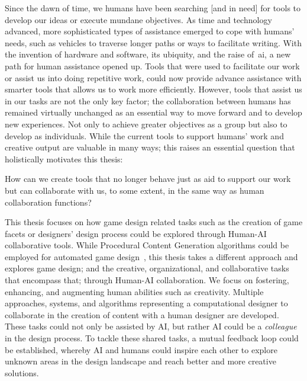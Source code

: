 Since the dawn of time, we humans have been searching [and in need] for tools to develop our ideas or execute mundane objectives. As time and technology advanced, more sophisticated types of assistance emerged to cope with humans' needs, such as vehicles to traverse longer paths or ways to facilitate writing. With the invention of hardware and software, its ubiquity, and the raise of~\acrfull{ai}, a new path for human assistance opened up. Tools that were used to facilitate our work or assist us into doing repetitive work, could now provide advance assistance with smarter tools that allows us to work more efficiently. However, tools that assist us in our tasks are not the only key factor; the collaboration between humans has remained virtually unchanged as an essential way to move forward and to develop new experiences. Not only to achieve greater objectives as a group but also to develop as individuals. While the current tools to support humans' work and creative output are valuable in many ways; this raises an essential question that holistically motivates this thesis:

\setlength{\parindent}{0.9em}

\begin{retQuestion}{}
 How can we create tools that no longer behave just as aid to support our work but can collaborate with us, to some extent, in the same way as human collaboration functions? 
\end{retQuestion}

This thesis focuses on how game design related tasks such as the creation of game facets or designers' design process could be explored through Human-AI collaborative tools. While Procedural Content Generation algorithms could be employed for automated game design~\cite{nelson_towards_2007,cook_software_2020,cook_getting_2020}, this thesis takes a different approach and explores game design; and the creative, organizational, and collaborative tasks that encompass that; through Human-AI collaboration. We focus on fostering, enhancing, and augmenting human abilities such as creativity. Multiple approaches, systems, and algorithms representing a computational designer to collaborate in the creation of content with a human designer are developed. These tasks could not only be assisted by AI, but rather AI could be a \emph{colleague} in the design process. To tackle these shared tasks, a mutual feedback loop could be established, whereby AI and humans could inspire each other to explore unknown areas in the design landscape and reach better and more creative solutions.

